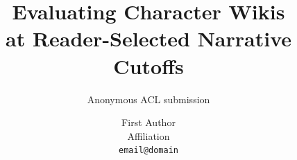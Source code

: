 \documentclass[11pt]{article}
\title{Evaluating Character Wikis\\at Reader-Selected Narrative Cutoffs}
\author{Anonymous ACL submission}
\author{First Author \\ Affiliation \\ \texttt{email@domain}}
\newif\ifnwreview     \nwreviewtrue     %
\newif\ifnwappendix   \nwappendixtrue   %
\newif\ifnwdecon      \nwdecontrue     %
\begin{document}
\maketitle










\label{nw:end-main}

\clearpage


\ifnwreview\else\fi



\ifnwappendix
\clearpage
\appendix











\ifnwdecon\fi



\fi
\end{document}
